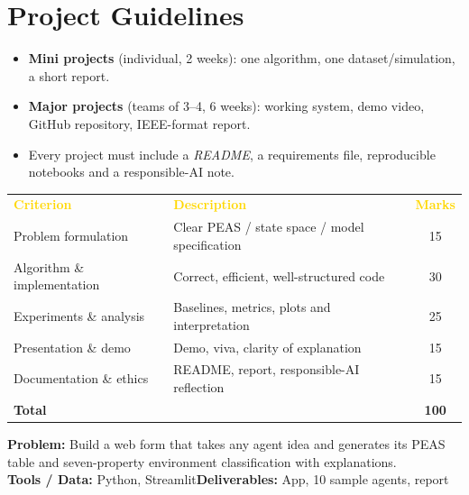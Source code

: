 \documentclass[11pt]{article}
\begin{document}
\section*{Project Guidelines}
\begin{itemize}\item \textbf{Mini projects} (individual, 2 weeks): one algorithm, one dataset/simulation, a short report.
\item \textbf{Major projects} (teams of 3--4, 6 weeks): working system, demo video, GitHub repository, IEEE-format report.
\item Every project must include a \emph{README}, a requirements file, reproducible notebooks and a responsible-AI note.\end{itemize}
\begin{center}\begin{tabular}{lp{9cm}c}\rowcolor{navy}\textcolor{gold}{\textbf{Criterion}}&\textcolor{gold}{\textbf{Description}}&\textcolor{gold}{\textbf{Marks}}\\
Problem formulation&Clear PEAS / state space / model specification&15\\
\rowcolor{ivory}Algorithm \& implementation&Correct, efficient, well-structured code&30\\
Experiments \& analysis&Baselines, metrics, plots and interpretation&25\\
\rowcolor{ivory}Presentation \& demo&Demo, viva, clarity of explanation&15\\
Documentation \& ethics&README, report, responsible-AI reflection&15\\\midrule
\textbf{Total}&&\textbf{100}\\\end{tabular}\end{center}\newpage
{}
\begin{tcolorbox}[enhanced,breakable,colback=white,colframe=teal,arc=2mm,boxrule=0.9pt,
  title={\textbf{PI.01\quad Smart Campus PEAS Designer}\hfill \colorbox{white}{\textcolor{teal}{\scriptsize\bfseries MINI}}},fonttitle=\color{white},colbacktitle=teal]
\textbf{\color{navy}Problem:} Build a web form that takes any agent idea and generates its PEAS table and seven-property environment classification with explanations.\\[2pt]
\textbf{\color{navy}Tools / Data:} Python, Streamlit\qquad \textbf{\color{navy}Deliverables:} App, 10 sample agents, report\\[2pt]
\ 
\end{tcolorbox}
\end{document}
